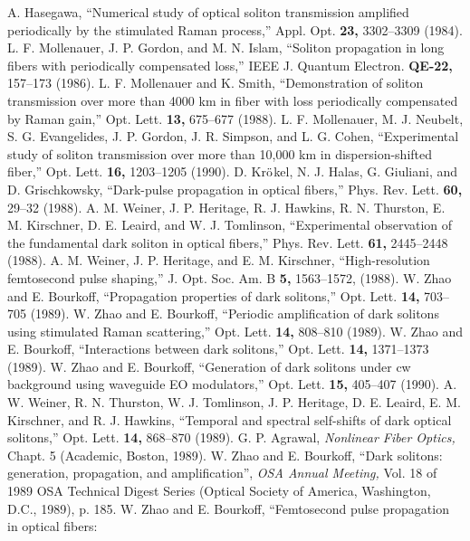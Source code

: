 \begin{references}
A. Hasegawa, ``Numerical study of optical soliton transmission amplified
periodically by the stimulated Raman process,'' Appl. Opt. {\bf 23,}
3302--3309 (1984).
L. F. Mollenauer, J. P. Gordon, and M. N. Islam, ``Soliton propagation in
long fibers with periodically compensated loss,'' IEEE J. Quantum Electron.
{\bf QE-22,} 157--173 (1986).
L. F. Mollenauer and K. Smith, ``Demonstration of soliton transmission over
more than 4000 km in fiber with loss periodically compensated by Raman
gain,'' Opt. Lett. {\bf 13,} 675--677 (1988).
L. F. Mollenauer, M. J. Neubelt, S. G. Evangelides, J. P. Gordon, J. R.
Simpson, and L. G. Cohen, ``Experimental study of soliton transmission over
more than 10,000 km in dispersion-shifted fiber,'' Opt. Lett. {\bf 16,}
1203--1205 (1990).
D. Kr$\rm {\ddot o}$kel, N. J. Halas, G. Giuliani, and D. Grischkowsky,
``Dark-pulse propagation in optical fibers,'' Phys. Rev. Lett. {\bf 60,}
29--32 (1988).
A. M. Weiner, J. P. Heritage, R. J. Hawkins, R. N. Thurston, E. M.
Kirschner, D. E. Leaird, and W. J. Tomlinson, ``Experimental observation of
the fundamental dark soliton in optical fibers,'' Phys. Rev. Lett. {\bf
61,} 2445--2448 (1988).
A. M. Weiner, J. P. Heritage, and E. M. Kirschner, ``High-resolution
femtosecond pulse shaping,'' J. Opt. Soc. Am. B {\bf 5,} 1563--1572,
(1988).
W. Zhao and E. Bourkoff, ``Propagation properties of dark solitons,'' Opt.
Lett. {\bf 14,} 703--705 (1989).
W. Zhao and E. Bourkoff, ``Periodic amplification of dark solitons using
stimulated Raman scattering,'' Opt. Lett. {\bf 14,} 808--810 (1989).
W. Zhao and E. Bourkoff, ``Interactions between dark solitons,'' Opt. Lett.
{\bf 14,} 1371--1373 (1989).
W. Zhao and E. Bourkoff, ``Generation of dark solitons under cw background
using waveguide EO modulators,'' Opt. Lett. {\bf 15,} 405--407 (1990).
A. W. Weiner, R. N. Thurston, W. J. Tomlinson, J. P. Heritage, D. E.
Leaird, E. M. Kirschner, and R. J. Hawkins, ``Temporal and spectral
self-shifts of dark optical solitons,''  Opt. Lett. {\bf 14,} 868--870
(1989).
G. P. Agrawal, {\it Nonlinear Fiber Optics,} Chapt. 5 (Academic, Boston,
1989).
W. Zhao and E. Bourkoff, ``Dark solitons: generation, propagation,  and
amplification'', {\it OSA Annual Meeting,} Vol. 18 of 1989 OSA Technical
Digest Series (Optical Society of America, Washington, D.C., 1989), p. 185.
W. Zhao and E. Bourkoff, ``Femtosecond pulse propagation in optical fibers:

\end{references}
